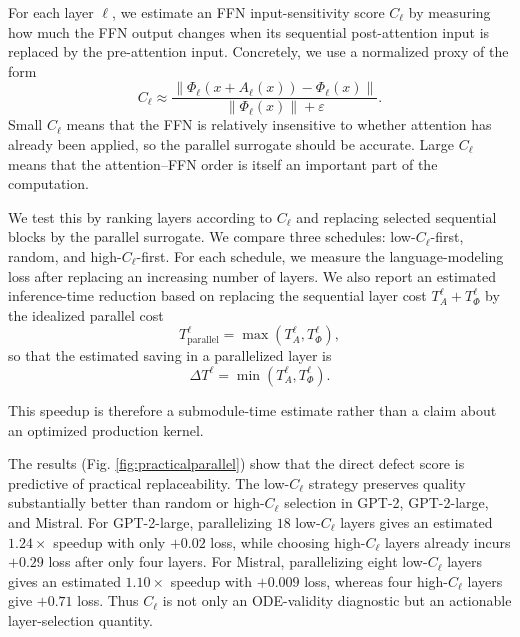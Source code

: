 \documentclass[11pt]{article}
\begin{document}
For each layer $\ell$, we estimate an FFN
input-sensitivity score $C_\ell$ by measuring how much the FFN output changes
when its sequential post-attention input is replaced by the pre-attention input.
Concretely, we use a normalized proxy of the form
\begin{equation}
C_\ell
\approx
\frac{
\left\|
\Phi_\ell\left(x+A_\ell(x)\right)-\Phi_\ell(x)
\right\|
}{
\left\|
\Phi_\ell(x)
\right\|+\varepsilon
}.
\end{equation}
Small $C_\ell$ means that the FFN is relatively insensitive to whether attention
has already been applied, so the parallel surrogate should be accurate. Large
$C_\ell$ means that the attention--FFN order is itself an important part of the
computation.

We test this by ranking layers according to $C_\ell$ and replacing selected
sequential blocks by the parallel surrogate. We compare three schedules:
low-$C_\ell$-first, random, and high-$C_\ell$-first. For each schedule, we
measure the language-modeling loss after replacing an increasing number of
layers. We also report an estimated inference-time reduction based on replacing
the sequential layer cost $T_A^\ell+T_\Phi^\ell$ by the idealized parallel cost
\begin{equation}
T_{\mathrm{parallel}}^\ell
=
\max\left(T_A^\ell,T_\Phi^\ell\right),
\end{equation}
so that the estimated saving in a parallelized layer is
\begin{equation}
\Delta T^\ell
=
\min\left(T_A^\ell,T_\Phi^\ell\right).
\end{equation}

This speedup is therefore a submodule-time estimate rather than a claim about an
optimized production kernel.

The results (Fig. \ref{fig:practicalparallel}) show that the direct defect score is predictive of practical
replaceability. The low-$C_\ell$ strategy preserves quality substantially better
than random or high-$C_\ell$ selection in GPT-2, GPT-2-large, and Mistral. For
GPT-2-large, parallelizing $18$ low-$C_\ell$ layers gives an estimated
$1.24\times$ speedup with only $+0.02$ loss, while choosing high-$C_\ell$ layers
already incurs $+0.29$ loss after only four layers. For Mistral, parallelizing
eight low-$C_\ell$ layers gives an estimated $1.10\times$ speedup with
$+0.009$ loss, whereas four high-$C_\ell$ layers give $+0.71$ loss. Thus
$C_\ell$ is not only an ODE-validity diagnostic but an actionable
layer-selection quantity.
\end{document}
